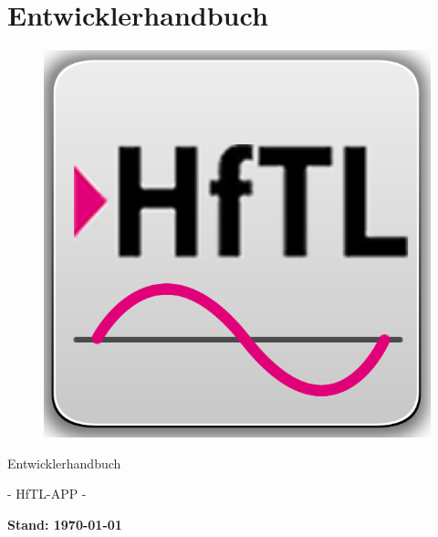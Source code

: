\newpage
\section{Entwicklerhandbuch}

\begin{figure}[h]
	\centering
	\includegraphics[scale=2.5]{03_Bedienungsanleitung/img/Logo_HFTl_App.png}
	\label{img:grafik-dummy}
\end{figure}

\begin{center}
	{\huge Entwicklerhandbuch}
\end{center}

\begin{center}
	{\huge -  HfTL-APP  -}
\end{center}

\begin{center}
	\textbf{{\large Stand: {\today}}}
\end{center}

\newpage
\tableofcontents
\newpage

